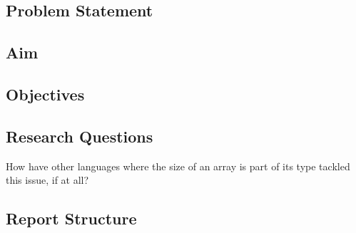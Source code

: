 \subsection{Problem Statement}


\subsection{Aim}


\subsection{Objectives}


\subsection{Research Questions}

How have other languages where the size of an array is part of its type tackled
this issue, if at all?

\subsection{Report Structure}
